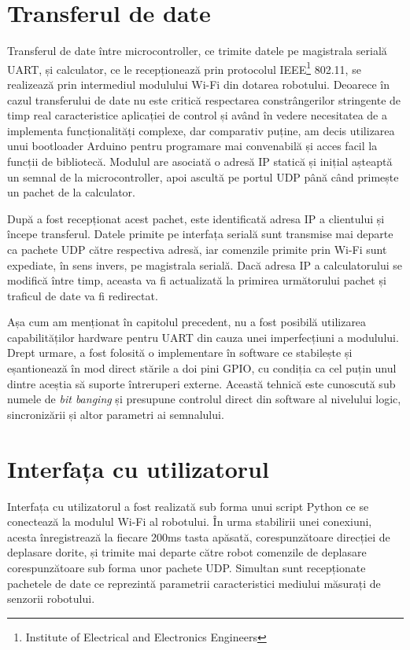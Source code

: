 \section{Transferul de date}

Transferul de date între microcontroller, ce trimite datele pe magistrala \mbox{serială} UART, și calculator, ce le recepționează prin protocolul IEEE\footnote{Institute of Electrical and Electronics Engineers} 802.11, se realizează prin intermediul modulului Wi-Fi din dotarea robotului. Deoarece în cazul \mbox{transferului} de date nu este critică respectarea constrângerilor stringente de timp real caracteristice aplicației de control și având în vedere necesitatea de a implementa funcționalități complexe, dar comparativ puține, am decis utilizarea unui bootloader Arduino pentru programare mai convenabilă și acces facil la funcții de bibliotecă. Modulul are asociată o adresă IP statică și inițial așteaptă un semnal de la microcontroller, apoi ascultă pe portul UDP până când primește un pachet de la calculator.

După a fost recepționat acest pachet, este identificată adresa IP a clientului și începe transferul. Datele primite pe interfața serială sunt transmise mai departe ca pachete UDP către respectiva adresă, iar comenzile primite prin Wi-Fi sunt expediate, în sens invers, pe magistrala serială. Dacă adresa IP a calculatorului se modifică între timp, aceasta va fi actualizată la primirea următorului pachet și traficul de date va fi redirectat.


Așa cum am menționat în capitolul precedent, nu a fost posibilă utilizarea capabilităților hardware pentru UART din cauza unei imperfecțiuni a modulului. Drept urmare, a fost folosită o implementare în software ce stabilește și eșantionează în mod direct stările a doi pini GPIO, cu condiția ca cel puțin unul dintre aceștia să suporte întreruperi externe. Această tehnică este cunoscută sub numele de \textit{bit banging} și presupune controlul direct din software al nivelului logic, sincronizării și altor parametri ai semnalului.

\section{Interfața cu utilizatorul}

Interfața cu utilizatorul a fost realizată sub forma unui script Python ce se conectează la modulul Wi-Fi al robotului. În urma stabilirii unei conexiuni, acesta înregistrează la fiecare 200ms tasta apăsată, corespunzătoare direcției de deplasare dorite, și trimite mai departe către robot comenzile de deplasare corespunzătoare sub forma unor pachete UDP. Simultan sunt recepționate pachetele de date ce reprezintă parametrii caracteristici mediului măsurați de senzorii robotului.

